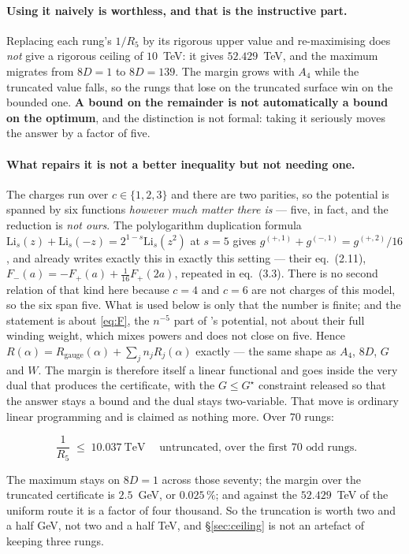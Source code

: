 \documentclass[11pt,a4paper]{article}
\newenvironment{keyeq}
  {\begin{center}\setlength{\fboxsep}{9pt}\setlength{\fboxrule}{0.8pt}%
   \begin{lrbox}{\keyeqbox}\begin{minipage}{0.88\textwidth}}
  {\end{minipage}\end{lrbox}%
   \fcolorbox{hdrblue!55}{hdrblue!6}{\usebox{\keyeqbox}}\end{center}}
\begin{document}
\paragraph{Using it naively is worthless, and that is the instructive part.} Replacing each rung's
$1/R_5$ by its rigorous upper value and re-maximising does \emph{not} give a rigorous ceiling of
$10$~TeV: it gives $52.429$~TeV, and the maximum migrates from $8D=1$ to $8D=139$. The margin grows
with $A_4$ while the truncated value falls, so the rungs that lose on the truncated surface win on
the bounded one. \textbf{A bound on the remainder is not automatically a bound on the optimum}, and
the distinction is not formal: taking it seriously moves the answer by a factor of five.

\paragraph{What repairs it is not a better inequality but not needing one.} The charges run over
$c\in\{1,2,3\}$ and there are two parities, so the potential is spanned by six functions
\emph{however much matter there is} --- five, in fact, and the reduction is \emph{not ours}. The
polylogarithm duplication formula $\mathrm{Li}_s(z)+\mathrm{Li}_s(-z)=2^{1-s}\mathrm{Li}_s(z^2)$
\cite{Wood} at $s=5$ gives $g^{(+,1)}+g^{(-,1)}=g^{(+,2)}/16$, and \cite{CCD24} already writes
exactly this in exactly this setting --- their eq.~(2.11), $F_-(a)=-F_+(a)+\tfrac1{16}F_+(2a)$,
repeated in \cite{Cac25} eq.~(3.3). There is no second relation of that kind here because $c=4$ and
$c=6$ are not charges of this model, so the six span five. What is used below is only that the
number is finite; and the statement is about \eqref{eq:F}, the $n^{-5}$ part of \cite{KM25}'s
potential, not about their full winding weight, which mixes powers and does not close on five.
Hence
$R(\alpha)=R_{\text{gauge}}(\alpha)+\sum_j n_j R_j(\alpha)$ exactly --- the same shape as $A_4$,
$8D$, $G$ and $W$. The margin is therefore itself a linear functional and goes inside the very dual
that produces the certificate, with the $G\le G^\star$ constraint released so that the answer stays
a bound and the dual stays two-variable. That move is ordinary linear programming \cite{Schrijver}
and is claimed as nothing more. Over $70$ rungs:
\begin{keyeq}
\begin{equation}\label{eq:rigorousceiling}
  \boxed{\;\frac{1}{R_5}\;\le\;10.037\ \text{TeV}\;}
  \quad\text{untruncated, over the first $70$ odd rungs.}
\end{equation}
\end{keyeq}
\noindent The maximum stays on $8D=1$ across those seventy; the margin over the truncated
certificate is $2.5$~GeV, or $0.025\,\%$; and against the $52.429$~TeV of the uniform route it is
a factor of four thousand. So the truncation is worth two and a half GeV, not two and a half TeV,
and \S\ref{sec:ceiling} is not an artefact of keeping three rungs.
\end{document}
